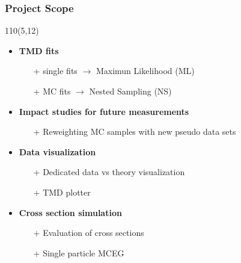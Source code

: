 
\begin{frame}
\frametitle{\textbf{Project Scope}}
\begin{textblock}{110}(5,12) 
\begin{itemize}
\item \textbf{TMD fits}

  \begin{itemize}
  \item[+] single fits $\to$ Maximun Likelihood (ML)  
  \item[+] MC fits  $\to$ Nested Sampling (NS)  
  \end{itemize}

\item \textbf{Impact studies for future measurements}

  \begin{itemize}
  \item[+] Reweighting MC samples with new pseudo data sets
  \end{itemize}

\item \textbf{Data visualization}

  \begin{itemize}
  \item[+] Dedicated data vs theory visualization
  \item[+] TMD plotter
  \end{itemize}

\item \textbf{Cross section simulation}

  \begin{itemize}
  \item[+] Evaluation of cross sections 
  \item[+] Single particle MCEG
  \end{itemize}
  
\end{itemize}
\end{textblock}
\end{frame}

